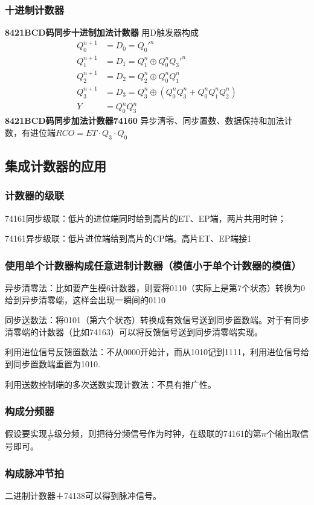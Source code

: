 \documentclass{ctexart}
\newcommand*{\noindbf}[1]{{\noindent \bf{#1} \qquad}}
\begin{document}
\subsubsection{十进制计数器}
\noindbf{8421BCD码同步十进制加法计数器}
用D触发器构成
\begin{align}
    Q_0^{n+1}&=D_0=Q_0'^n\\
    Q_1^{n+1}&=D_1=Q_1^n \oplus Q_0^n Q_3'^n\\
    Q_2^{n+1}&=D_2=Q_2^n \oplus Q_0^n Q_1^n\\
    Q_3^{n+1}&=D_3=Q_3^n \oplus (Q_0^n Q_3 ^n + Q_0^n Q_1 ^n Q_2^n)\\
    Y&=Q_0^n Q_3^n
\end{align}
\noindbf{8421BCD码同步加法计数器74160}异步清零、同步置数、数据保持和加法计数，有进位端$RCO=ET\cdot Q_3 \cdot Q_0$
\subsection{集成计数器的应用}
\subsubsection{计数器的级联}
74161同步级联：低片的进位端同时给到高片的ET、EP端，两片共用时钟；

74161异步级联：低片进位端{\color{red}{取非}}给到高片的CP端。高片ET、EP端接1
\subsubsection{使用单个计数器构成任意进制计数器（模值小于单个计数器的模值）}
异步清零法：比如要产生模6计数器，则要将0110（实际上是第7个状态）转换为0给到异步清零端，这样会出现一瞬间的0110

同步送数法：将0101（第六个状态）转换成有效信号送到同步置数端。对于有同步清零端的计数器（比如74163）可以将反馈信号送到同步清零端实现。

利用进位信号反馈置数法：不从0000开始计，而从1010记到1111，利用进位信号给到同步置数端重置为1010.

利用送数控制端的多次送数实现计数法：不具有推广性。
\subsubsection{构成分频器}
假设要实现$\frac{1}{2^n}$级分频，则把待分频信号作为时钟，在级联的74161的第$n$个输出取信号即可。
\subsubsection{构成脉冲节拍}
二进制计数器＋74138可以得到脉冲信号。
\end{document}
